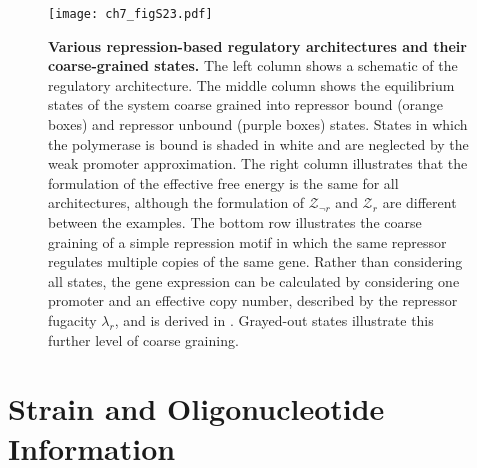 \documentclass[12pt]{caltech_thesis}
\begin{document}
\hypertarget{fig:twostate_archs}{%
\begin{figure}
\centering
\texttt{[image: ch7\_figS23.pdf]}
\caption[{Various repression-based regulatory architectures and their
coarse-grained states.}]{\textbf{Various repression-based regulatory
architectures and their coarse-grained states.} The left column shows a
schematic of the regulatory architecture. The middle column shows the
equilibrium states of the system coarse grained into repressor bound
(orange boxes) and repressor unbound (purple boxes) states. States in
which the polymerase is bound is shaded in white and are neglected by
the weak promoter approximation. The right column illustrates that the
formulation of the effective free energy is the same for all
architectures, although the formulation of \(\mathcal{Z}_{\neg r}\) and
\(\mathcal{Z}_r\) are different between the examples. The bottom row
illustrates the coarse graining of a simple repression motif in which
the same repressor regulates multiple copies of the same gene. Rather
than considering all states, the gene expression can be calculated by
considering one promoter and an effective copy number, described by the
repressor fugacity \(\lambda_r\), and is derived in
\textcite{weinert2014}. Grayed-out states illustrate this further level
of coarse graining.}
\label{fig:twostate_archs}
\end{figure}
}

\hypertarget{strain-and-oligonucleotide-information}{%
\section{Strain and Oligonucleotide
Information}\label{strain-and-oligonucleotide-information}}
\end{document}
